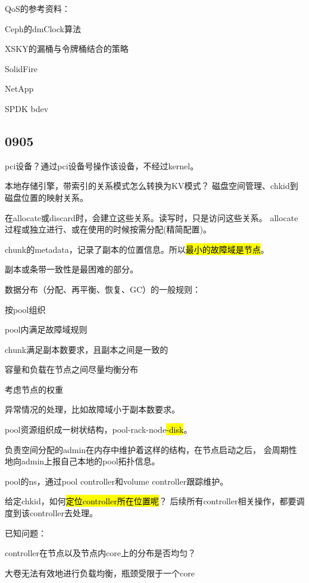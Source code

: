 QoS的参考资料：
\begin{enumbox}
\item Ceph的dmClock算法
\item XSKY的漏桶与令牌桶结合的策略
\item SolidFire
\item NetApp
\item SPDK bdev
\end{enumbox}

\subsection{0905}

pci设备？通过pci设备号操作该设备，不经过kernel。

本地存储引擎，带索引的关系模式怎么转换为KV模式？
磁盘空间管理、chkid到磁盘位置的映射关系。

在allocate或discard时，会建立这些关系。读写时，只是访问这些关系。
allocate过程或独立进行、或在使用的时候按需分配(精简配置)。

chunk的metadata，记录了副本的位置信息。所以\hl{最小的故障域是节点}。

副本或条带一致性是最困难的部分。

数据分布（分配、再平衡、恢复、GC）的一般规则：
\begin{enumbox}
\item 按pool组织
\item pool内满足故障域规则
\item chunk满足副本数要求，且副本之间是一致的
\item 容量和负载在节点之间尽量均衡分布
\item 考虑节点的权重
\end{enumbox}

异常情况的处理，比如故障域小于副本数要求。

pool资源组织成一树状结构，pool-rack-node\hl{-disk}。

负责空间分配的admin在内存中维护着这样的结构，在节点启动之后，
会周期性地向admin上报自己本地的pool拓扑信息。

pool的ns，通过pool controller和volume controller跟踪维护。

给定chkid，如何\hl{定位controller所在位置呢}？
后续所有controller相关操作，都要调度到该controller去处理。

已知问题：
\begin{enumbox}
\item controller在节点以及节点内core上的分布是否均匀？
\item 大卷无法有效地进行负载均衡，瓶颈受限于一个core
\end{enumbox}

